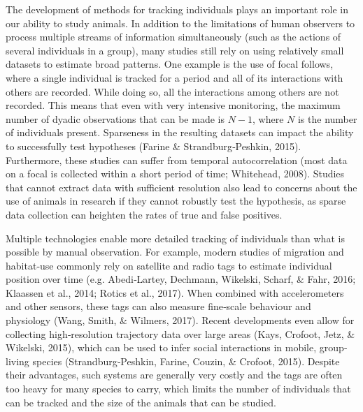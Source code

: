 \documentclass[11pt,a4paper,twoside]{book}
\begin{document}
\begin{doublespace}
    The development of methods for tracking individuals plays an important role in our ability to study animals. In addition to the limitations of human observers to process multiple streams of information simultaneously (such as the actions of several individuals in a group), many studies still rely on using relatively small datasets to estimate broad patterns. One example is the use of focal follows, where a single individual is tracked for a period and all of its interactions with others are recorded. While doing so, all the interactions among others are not recorded. This means that even with very intensive monitoring, the maximum number of dyadic observations that can be made is $N - 1$, where $N$ is the number of individuals present. Sparseness in the resulting datasets can impact the ability to successfully test hypotheses (Farine & Strandburg‐Peshkin, 2015). Furthermore, these studies can suffer from temporal autocorrelation (most data on a focal is collected within a short period of time; Whitehead, 2008). Studies that cannot extract data with sufficient resolution also lead to concerns about the use of animals in research if they cannot robustly test the hypothesis, as sparse data collection can heighten the rates of true and false positives.
    
    Multiple technologies enable more detailed tracking of individuals than what is possible by manual observation. For example, modern studies of migration and habitat‐use commonly rely on satellite and radio tags to estimate individual position over time (e.g. Abedi‐Lartey, Dechmann, Wikelski, Scharf, \& Fahr, 2016; Klaassen et al., 2014; Rotics et al., 2017). When combined with accelerometers and other sensors, these tags can also measure fine‐scale behaviour and physiology (Wang, Smith, \& Wilmers, 2017). Recent developments even allow for collecting high‐resolution trajectory data over large areas (Kays, Crofoot, Jetz, \& Wikelski, 2015), which can be used to infer social interactions in mobile, group‐living species (Strandburg‐Peshkin, Farine, Couzin, \& Crofoot, 2015). Despite their advantages, such systems are generally very costly and the tags are often too heavy for many species to carry, which limits the number of individuals that can be tracked and the size of the animals that can be studied.
    

\end{doublespace}
\end{document}
